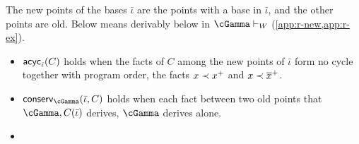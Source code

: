 \begin{definition}
\label{def:creation}
The new points of the bases $\bar\iota$ are the points with a base in $\bar\iota$, and the other points are old. Below means derivably below in $\cGamma \vdash_W$ (\cref{app:r-new,app:r-ex}).
\begin{itemize}
  \item $\mathsf{acyc}_{\bar\iota}(C)$ holds when the facts of $C$ among the new points of $\bar\iota$ form no cycle together with program order, the facts $x \prec x^{+}$ and $x \prec \overline{x}^{+}$.
  \item $\conserv_{\cGamma}(\bar\iota, C)$ holds when each fact between two old points that $\cGamma, C(\bar\iota)$ derives, $\cGamma$ derives alone.
  \item {}            \lfw{$\bar\iota$}                                                                                                   
\end{itemize}
\end{definition}
